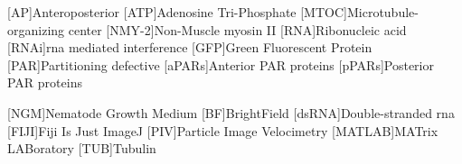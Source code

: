\begin{acronym}

[AP]{Anteroposterior}
[ATP]{Adenosine Tri-Phosphate}
[MTOC]{Microtubule-organizing center}
[NMY-2]{Non-Muscle myosin II}
[RNA]{Ribonucleic acid}
[RNAi]{\acs{rna} mediated interference}
[GFP]{Green Fluorescent Protein}
[PAR]{Partitioning defective}
[aPARs]{Anterior PAR proteins}
[pPARs]{Posterior PAR proteins}

[NGM]{Nematode Growth Medium}
[BF]{BrightField}
[dsRNA]{Double-stranded \acs{rna}}
[FIJI]{Fiji Is Just ImageJ}
[PIV]{Particle Image Velocimetry}
[MATLAB]{MATrix LABoratory}
[TUB]{Tubulin}

\end{acronym}